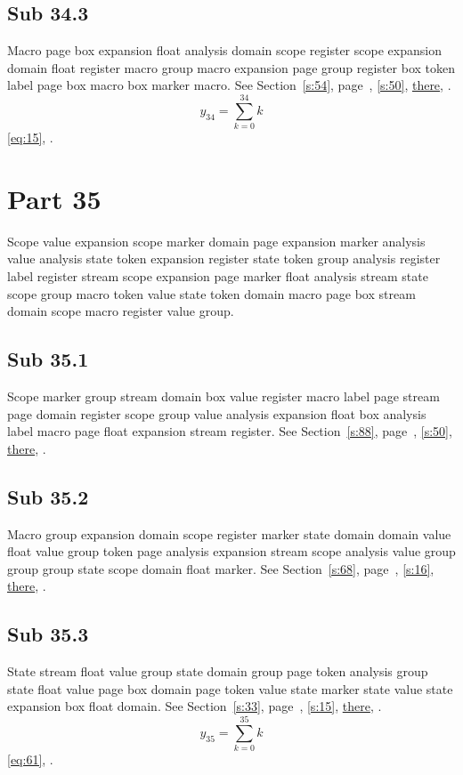 \documentclass[11pt]{article}
\begin{document}
\subsection{Sub 34.3}\label{ss:34.3} Macro page box expansion float analysis domain scope register scope expansion domain float register macro group macro expansion page group register box token label page box macro box marker macro. See Section~\ref{s:54}, page~\pageref{ss:82.3}, \cref{s:50}, \hyperref[s:71]{there}, \cite{k29,k80}.
\begin{equation}y_{34}=\sum_{k=0}^{34}k\label{eq:34}\end{equation} \eqref{eq:15}, .
\section{Part 35}\label{s:35}
Scope value expansion scope marker domain page expansion marker analysis value analysis state token expansion register state token group analysis register label register stream scope expansion page marker float analysis stream state scope group macro token value state token domain macro page box stream domain scope macro register value group.
\subsection{Sub 35.1}\label{ss:35.1} Scope marker group stream domain box value register macro label page stream page domain register scope group value analysis expansion float box analysis label macro page float expansion stream register. See Section~\ref{s:88}, page~\pageref{ss:97.3}, \cref{s:50}, \hyperref[s:48]{there}, \cite{k57,k28}.
\subsection{Sub 35.2}\label{ss:35.2} Macro group expansion domain scope register marker state domain domain value float value group token page analysis expansion stream scope analysis value group group group state scope domain float marker. See Section~\ref{s:68}, page~\pageref{ss:20.3}, \cref{s:16}, \hyperref[s:45]{there}, \cite{k67,k85}.
\subsection{Sub 35.3}\label{ss:35.3} State stream float value group state domain group page token analysis group state float value page box domain page token value state marker state value state expansion box float domain. See Section~\ref{s:33}, page~\pageref{ss:65.3}, \cref{s:15}, \hyperref[s:63]{there}, \cite{k104,k70}.
\begin{equation}y_{35}=\sum_{k=0}^{35}k\label{eq:35}\end{equation} \eqref{eq:61}, .
\end{document}
